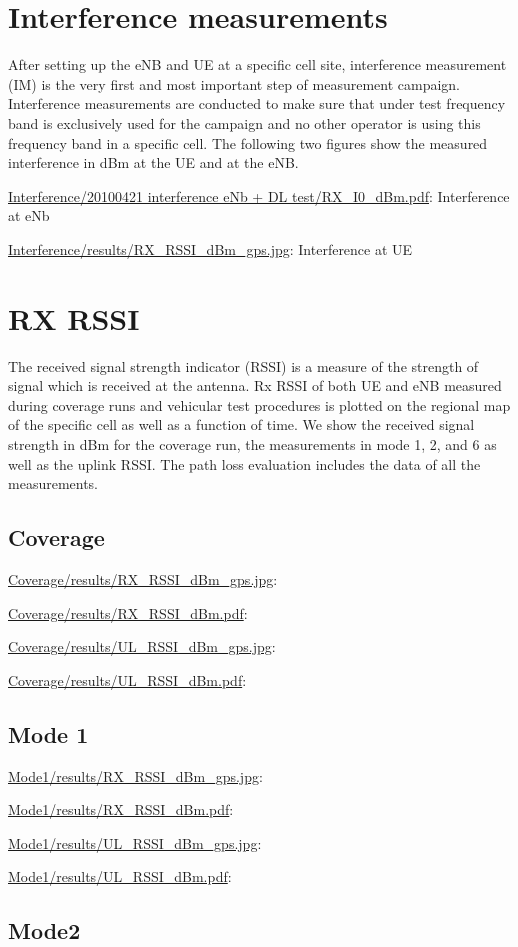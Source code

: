 \documentclass[a4paper,10pt]{article}
\newcommand{\printfile}[2][]{
 \begin{minipage}{8cm}
  \centering
  \url{#2}: #1

 \end{minipage}
}
\begin{document}
\section{Interference measurements}

After setting up the eNB and UE at a specific cell site, interference measurement (IM) is the very first and most important step of measurement campaign. Interference measurements are conducted to make sure that under test frequency band is exclusively used for the campaign and no other operator is using this frequency band in a specific cell. The following two figures show the measured interference in dBm at the UE and at the eNB.


\printfile[Interference at eNb]{Interference/20100421 interference eNb + DL test/RX_I0_dBm.pdf}
\printfile[Interference at UE]{Interference/results/RX_RSSI_dBm_gps.jpg}


\section{RX RSSI}


The received signal strength indicator (RSSI) is a measure of the strength of signal which is received at the antenna. Rx RSSI of both UE and eNB measured during coverage runs and vehicular test procedures is plotted on the regional map of the specific cell as well as a function of time. We show the received signal strength in dBm for the coverage run, the measurements in mode 1, 2, and 6 as well as the uplink RSSI. The path loss evaluation includes the data of all the measurements.


\subsection{Coverage}
\printfile{Coverage/results/RX_RSSI_dBm_gps.jpg}
\printfile{Coverage/results/RX_RSSI_dBm.pdf}

\printfile{Coverage/results/UL_RSSI_dBm_gps.jpg}
\printfile{Coverage/results/UL_RSSI_dBm.pdf}

\subsection{Mode 1}
\printfile{Mode1/results/RX_RSSI_dBm_gps.jpg}
\printfile{Mode1/results/RX_RSSI_dBm.pdf}

\printfile{Mode1/results/UL_RSSI_dBm_gps.jpg}
\printfile{Mode1/results/UL_RSSI_dBm.pdf}

\subsection{Mode2}
\end{document}
